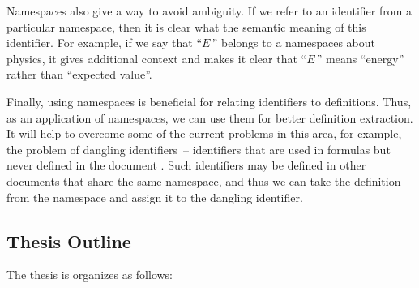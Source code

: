 Namespaces also give a way to avoid ambiguity. If we refer to an identifier from a 
particular namespace, then it is clear what the semantic meaning of this 
identifier. For example, if we say that ``$E$\,'' belongs to a namespaces 
about physics, it gives additional context and makes it clear that ``$E$\,''
means ``energy'' rather than ``expected value''.

Finally, using namespaces is beneficial for relating identifiers to 
definitions. Thus, as an application of namespaces, we can use them for better 
definition extraction. It will help to overcome some of the current problems in 
this area, for example, the problem of dangling identifiers~-- identifiers that are 
used in  formulas but never defined in the document \cite{pagael2014mlp}. 
Such identifiers may be defined in other documents that share the same namespace, 
and thus we can take the definition from the namespace and assign it to the dangling identifier.




\subsection{Thesis Outline}

The thesis is organizes as follows: 

